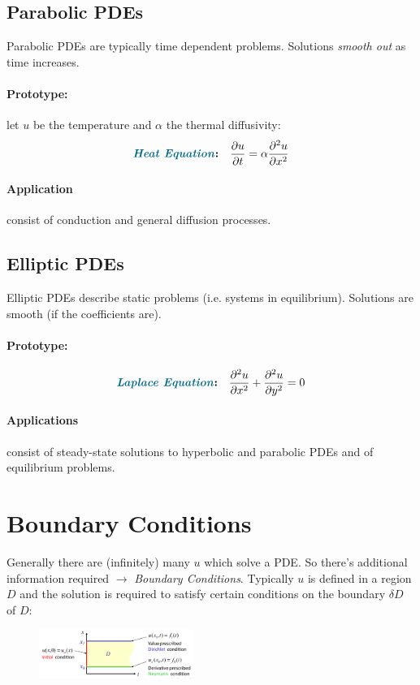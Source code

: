 \begin{multicols}{2}
\subsection{Parabolic PDEs}
Parabolic PDEs are typically time dependent problems. Solutions \emph{smooth out} as time increases.
\paragraph{Prototype:} let $u$ be the temperature and $\alpha$ the thermal diffusivity:
\begin{align*}
	\textbf{\emph{Heat Equation}:}\quad {\partial u \over \partial t} = \alpha {\partial^2 u \over \partial x^2}
\end{align*}

\paragraph{Application} consist of conduction and general diffusion processes.

\subsection{Elliptic PDEs}
Elliptic PDEs describe static problems (i.e. systems in equilibrium). Solutions are smooth (if the coefficients are).
\paragraph{Prototype:} 
\begin{align*}
	\textbf{\emph{Laplace Equation}:}\quad {\partial^2 u \over \partial x^2} + {\partial^2 u \over \partial y^2} = 0
\end{align*}

\paragraph{Applications} consist of steady-state solutions to hyperbolic and parabolic PDEs and of equilibrium problems.

\section{Boundary Conditions}
Generally there are (infinitely) many $u$ which solve a PDE. So there's additional information required $\rightarrow$ \emph{Boundary Conditions}. Typically $u$ is defined in a region $D$ and the solution is required to satisfy certain conditions on the boundary $\delta D$ of $D$:
\begin{figure}[H]
	\centering
	\includegraphics[width=0.45\textwidth]{img/03_boundary_conditions}
\end{figure}


\end{multicols}
